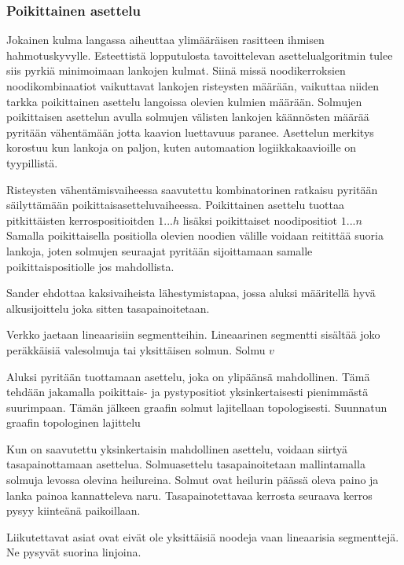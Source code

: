 \documentclass[finnish,12pt]{article}
\begin{document}
		\subsubsection{Poikittainen asettelu}

Jokainen kulma langassa aiheuttaa ylimääräisen rasitteen ihmisen hahmotuskyvylle. \cite{RefWorks:47}
Esteettistä lopputulosta tavoittelevan asettelualgoritmin tulee siis pyrkiä minimoimaan lankojen kulmat.
Siinä missä noodikerroksien noodikombinaatiot vaikuttavat lankojen risteysten määrään, vaikuttaa niiden tarkka poikittainen asettelu langoissa olevien kulmien määrään.
Solmujen poikittaisen asettelun avulla solmujen välisten lankojen käännösten määrää pyritään vähentämään jotta kaavion luettavuus paranee.
Asettelun merkitys korostuu kun lankoja on paljon, kuten automaation logiikkakaavioille on tyypillistä.

Risteysten vähentämisvaiheessa saavutettu kombinatorinen ratkaisu pyritään säilyttämään poikittaisasetteluvaiheessa.
Poikittainen asettelu tuottaa pitkittäisten kerrospositioitden $1 ... h$ lisäksi poikittaiset noodipositiot $1 ... n $
Samalla poikittaisella positiolla olevien noodien välille voidaan reitittää suoria lankoja, joten solmujen seuraajat pyritään sijoittamaan samalle poikittaispositiolle jos mahdollista.

Sander ehdottaa kaksivaiheista lähestymistapaa, jossa aluksi määritellä hyvä alkusijoittelu joka sitten tasapainoitetaan.


Verkko jaetaan lineaarisiin segmentteihin.
Lineaarinen segmentti sisältää joko peräkkäisiä valesolmuja tai yksittäisen solmun. Solmu $v$

Aluksi pyritään tuottamaan asettelu, joka on ylipäänsä mahdollinen.
Tämä tehdään jakamalla poikittais- ja pystypositiot yksinkertaisesti pienimmästä suurimpaan.
Tämän jälkeen graafin solmut lajitellaan topologisesti.
Suunnatun graafin topologinen lajittelu


Kun on saavutettu yksinkertaisin mahdollinen asettelu, voidaan siirtyä tasapainottamaan asettelua.
Solmuasettelu tasapainoitetaan mallintamalla solmuja levossa olevina heilureina.
Solmut ovat heilurin päässä oleva paino ja lanka painoa kannatteleva naru.
Tasapainotettavaa kerrosta seuraava kerros pysyy kiinteänä paikoillaan.

Liikutettavat asiat ovat eivät ole yksittäisiä noodeja vaan lineaarisia segmenttejä.
Ne pysyvät suorina linjoina.
\end{document}
